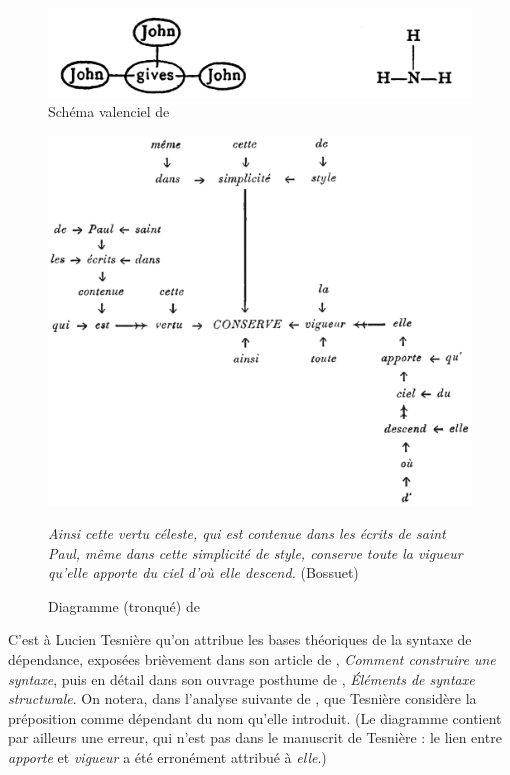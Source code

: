 {    \begin{figure}[H]
    \caption{Schéma valenciel de \citet{peirce1897logic}\label{fig:Peirce1897}}
    \includegraphics[width=\textwidth]{figures/vol1syntaxe2-img016.png}
    \end{figure}
    
    \begin{figure}[H]
    \caption{Diagramme (tronqué) de \citet{tesniere1934comment}}
    \includegraphics[width=\textwidth]{figures/Tesniere1934.png}\smallskip\\    
    \noindent\parbox{\textwidth}{\small\textit{Ainsi cette vertu céleste, qui est contenue dans les écrits de saint Paul, même dans cette simplicité de style, conserve toute la vigueur qu’elle apporte du ciel d’où elle descend.} (Bossuet)}
    \end{figure}

    
    C’est à Lucien Tesnière qu’on attribue les bases théoriques de la syntaxe de dépendance, exposées brièvement dans son article de \citeyear{tesniere1934comment}, \textit{Comment construire une syntaxe}, puis en détail dans son ouvrage posthume de \citeyear{tesniere1959elements}, \textit{Éléments de syntaxe structurale}. On notera, dans l’analyse suivante de \citeyear{tesniere1934comment}, que Tesnière considère la préposition comme dépendant du nom qu’elle introduit. (Le diagramme contient par ailleurs une erreur, qui n’est pas dans le manuscrit de Tesnière : le lien entre \textit{apporte} et \textit{vigueur} a été erronément attribué à \textit{elle}.)

}
